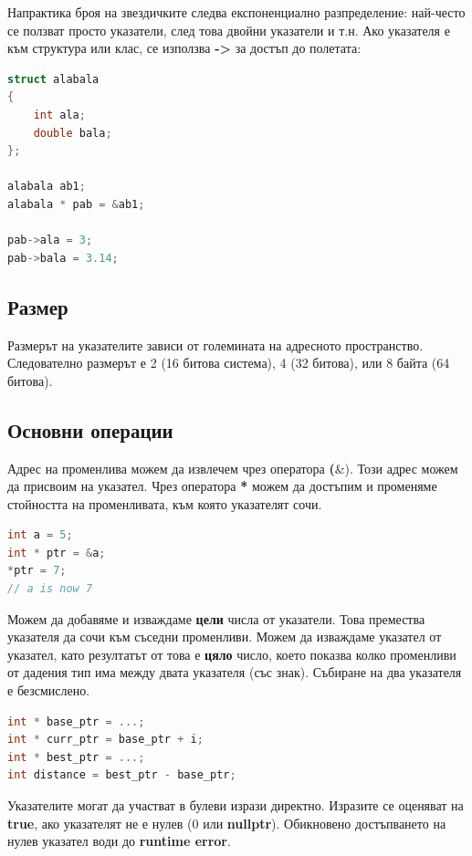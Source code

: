 \documentclass[fleqn,12pt]{article}
\begin{document}
Напрактика броя на звездичките следва експоненциално разпределение: най-често се ползват просто указатели, след това двойни указатели и т.н.
Ако указателя е към структура или клас, се използва \textbf{->} за достъп до полетата:

\begin{lstlisting}[language=C++, caption=Pointer to struct example]
struct alabala
{
    int ala;
    double bala;
};

alabala ab1;
alabala * pab = &ab1;

pab->ala = 3;
pab->bala = 3.14;
\end{lstlisting}

\subsection{Размер}
Размерът на указателите зависи от големината на адресното пространство. Следователно размерът е 2 (16 битова система), 4 (32 битова), 
или 8 байта (64 битова).

\subsection{Основни операции}
Адрес на променлива можем да извлечем чрез оператора \textbf(\&). Този адрес можем да присвоим на указател. 
Чрез оператора \textbf{*} можем да достъпим и променяме стойността на променливата, към която указателят сочи.
\begin{lstlisting}[language=C++, caption=Pointer example 2]
int a = 5;
int * ptr = &a;
*ptr = 7;
// a is now 7
\end{lstlisting}

Можем да добавяме и изваждаме \textbf{цели} числа от указатели. Това премества указателя да сочи към съседни променливи.
Можем да изваждаме указател от указател, като резултатът от това е \textbf{цяло} число, което показва колко променливи от 
дадения тип има между двата указателя (със знак). Събиране на два указателя е безсмислено.

\begin{lstlisting}[language=C++, caption=Pointer example 3]
int * base_ptr = ...;
int * curr_ptr = base_ptr + i;
int * best_ptr = ...;
int distance = best_ptr - base_ptr;
\end{lstlisting}

Указателите могат да участват в булеви изрази директно. Изразите се оценяват на \textbf{true}, ако указателят не е нулев (0 или \textbf{nullptr}).
Обикновено достъпването на нулев указател води до \textbf{runtime error}.
\end{document}
